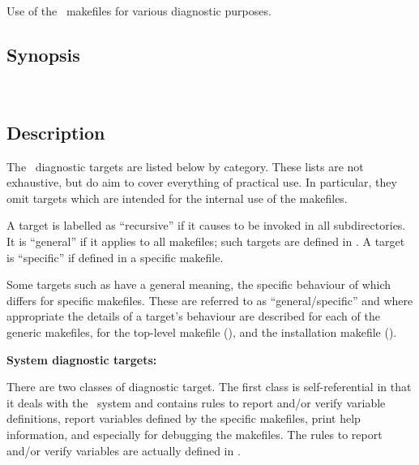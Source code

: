 Use of the \aipspp\ makefiles for various diagnostic purposes.

\subsection*{Synopsis}

\begin{synopsis}
   \\
\end{synopsis}

\subsection*{Description}

The \aipspp\ diagnostic targets are listed below by category.  These lists
are not exhaustive, but do aim to cover everything of practical use.  In
particular, they omit targets which are intended for the internal use of the
makefiles.

A target is labelled as ``recursive'' if it causes  to be
invoked in all subdirectories.  It is ``general'' if it applies to all
makefiles; such targets are defined in .  A target is
``specific'' if defined in a specific makefile.

Some targets such as  have a general meaning, the specific
behaviour of which differs for specific makefiles.  These are referred to as
``general/specific'' and where appropriate the details of a target's behaviour
are described for each of the generic makefiles, for the top-level makefile
(), and the installation makefile ().

\noindent
\textbf{System diagnostic targets:}

\noindent
There are two classes of diagnostic target.  The first class is
self-referential in that it deals with the \aipspp\ system and contains rules
to report and/or verify  variable definitions, report
variables defined by the specific makefiles, print help information, and
especially for debugging the makefiles.  The rules to report and/or verify
 variables are actually defined in .

